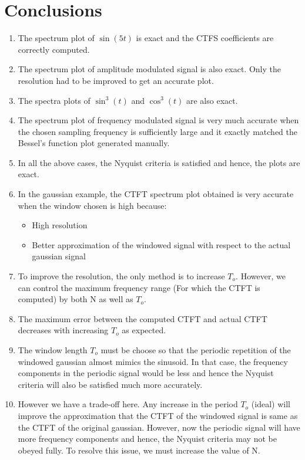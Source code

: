 \documentclass[12pt, a4paper]{article}
\begin{document}
\section{Conclusions}
\begin{enumerate}
    \item The spectrum plot of $\sin(5t)$ is exact and the CTFS coefficients are correctly computed.
    \item The spectrum plot of amplitude modulated signal is also exact. Only the resolution had to be improved to get an accurate plot.
    \item The spectra plots of $\sin^{3}(t)$ and $\cos^{3}(t)$ are also exact.
    \item The spectrum plot of frequency modulated signal is very much accurate when the chosen sampling frequency is sufficiently large and it exactly matched the Bessel's function plot generated manually.
    \item In all the above cases, the Nyquist criteria is satisfied and hence, the plots are exact.
    \item In the gaussian example, the CTFT spectrum plot obtained is very accurate when the window chosen is high because:
    \begin{itemize}
        \item High resolution
        \item Better approximation of the windowed signal with respect to the actual gaussian signal
    \end{itemize}
    \item To improve the resolution, the only method is to increase $T_{o}$. However, we can control the maximum frequency range (For which the CTFT is computed) by both N as well as $T_{o}$.
    \item The maximum error between the computed CTFT and actual CTFT decreases with increasing $T_{o}$ as expected.
    \item The window length $T_{o}$ must be choose so that the periodic repetition of the windowed gaussian almost mimics the sinusoid. In that case, the frequency components in the periodic signal would be less and hence the Nyquist criteria will also be satisfied much more accurately.
    \item However we have a trade-off here. Any increase in the period $T_{o}$ (ideal) will improve the approximation that the CTFT of the windowed signal is same as the CTFT of the original gaussian. However, now the periodic signal will have more frequency components and hence, the Nyquist criteria may not be obeyed fully. To resolve this issue, we must increase the value of N.
\end{enumerate}
\end{document}
